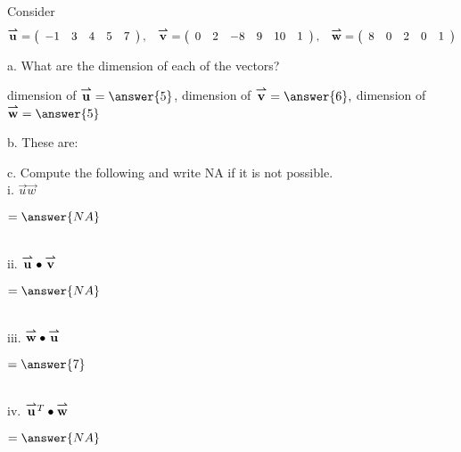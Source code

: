 \documentclass{ximera}
\author{Parisa Fatheddin}
\begin{document}
\begin{exercise}

Consider
\begin{equation*}
\vec{u} = \left(\begin{array}{ccccc} -1 & 3 & 4 & 5 & 7
\end{array}\right), \hspace{.3cm} \vec{v} = \left(\begin{array}{cccccc}
0 & 2 & -8 & 9 & 10 & 1
\end{array}\right), \hspace{.3cm} \vec{w} = \left(\begin{array}{ccccc}
8 & 0 & 2 & 0 & 1
\end{array}\right)
\end{equation*}

a. What are the dimension of each of the vectors? \\

\begin{prompt}
dimension of $\vec{u}= \answer{5}$, \hspace{.4cm} dimension of $\vec{v}= \answer{6},$ \hspace{.4cm} dimension of $\vec{w} = \answer{5}$
\end{prompt}


b. These are:
\begin{multipleChoice}
\end{multipleChoice}

c. Compute the following and write NA if it is not possible. \\

i. $\vec{u}\vec{w}$ \begin{prompt} $= \answer{NA}$\end{prompt}\\

ii. $\vec{u} \dotp \vec{v}$ \begin{prompt} $= \answer{NA}$\end{prompt}\\

iii. $\vec{w} \dotp \vec{u}$ \begin{prompt} $= \answer{7}$\end{prompt}\\

iv. $\vec{u}^{T} \dotp \vec{w}$ \begin{prompt} $= \answer{NA}$\end{prompt}\\


\end{exercise}
\end{document}
